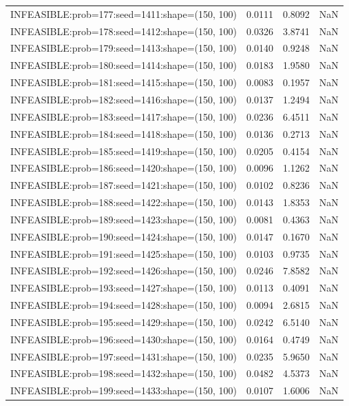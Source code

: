 \begin{longtable}{lccc}
INFEASIBLE:prob=177:seed=1411:shape=(150, 100) & 0.0111 &  0.8092 &    NaN \\
INFEASIBLE:prob=178:seed=1412:shape=(150, 100) & 0.0326 &  3.8741 &    NaN \\
INFEASIBLE:prob=179:seed=1413:shape=(150, 100) & 0.0140 &  0.9248 &    NaN \\
INFEASIBLE:prob=180:seed=1414:shape=(150, 100) & 0.0183 &  1.9580 &    NaN \\
INFEASIBLE:prob=181:seed=1415:shape=(150, 100) & 0.0083 &  0.1957 &    NaN \\
INFEASIBLE:prob=182:seed=1416:shape=(150, 100) & 0.0137 &  1.2494 &    NaN \\
INFEASIBLE:prob=183:seed=1417:shape=(150, 100) & 0.0236 &  6.4511 &    NaN \\
INFEASIBLE:prob=184:seed=1418:shape=(150, 100) & 0.0136 &  0.2713 &    NaN \\
INFEASIBLE:prob=185:seed=1419:shape=(150, 100) & 0.0205 &  0.4154 &    NaN \\
INFEASIBLE:prob=186:seed=1420:shape=(150, 100) & 0.0096 &  1.1262 &    NaN \\
INFEASIBLE:prob=187:seed=1421:shape=(150, 100) & 0.0102 &  0.8236 &    NaN \\
INFEASIBLE:prob=188:seed=1422:shape=(150, 100) & 0.0143 &  1.8353 &    NaN \\
INFEASIBLE:prob=189:seed=1423:shape=(150, 100) & 0.0081 &  0.4363 &    NaN \\
INFEASIBLE:prob=190:seed=1424:shape=(150, 100) & 0.0147 &  0.1670 &    NaN \\
INFEASIBLE:prob=191:seed=1425:shape=(150, 100) & 0.0103 &  0.9735 &    NaN \\
INFEASIBLE:prob=192:seed=1426:shape=(150, 100) & 0.0246 &  7.8582 &    NaN \\
INFEASIBLE:prob=193:seed=1427:shape=(150, 100) & 0.0113 &  0.4091 &    NaN \\
INFEASIBLE:prob=194:seed=1428:shape=(150, 100) & 0.0094 &  2.6815 &    NaN \\
INFEASIBLE:prob=195:seed=1429:shape=(150, 100) & 0.0242 &  6.5140 &    NaN \\
INFEASIBLE:prob=196:seed=1430:shape=(150, 100) & 0.0164 &  0.4749 &    NaN \\
INFEASIBLE:prob=197:seed=1431:shape=(150, 100) & 0.0235 &  5.9650 &    NaN \\
INFEASIBLE:prob=198:seed=1432:shape=(150, 100) & 0.0482 &  4.5373 &    NaN \\
INFEASIBLE:prob=199:seed=1433:shape=(150, 100) & 0.0107 &  1.6006 &    NaN \\

\end{longtable}

